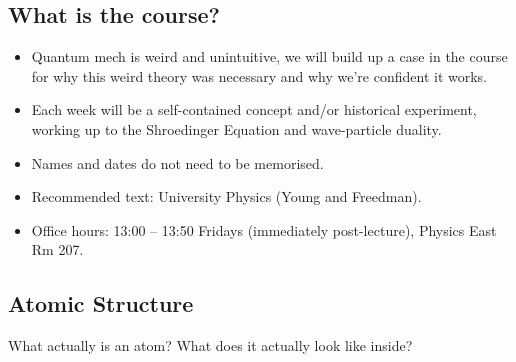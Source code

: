 
\subsection*{What is the course?}
\begin{itemize}
    \item Quantum mech is weird and unintuitive, we will build up a case in the course for why this weird theory was necessary and why we're confident it works.
    \item Each week will be a self-contained concept and/or historical experiment, working up to the Shroedinger Equation and wave-particle duality.
    \item Names and dates do not need to be memorised.
    \item Recommended text: University Physics (Young and Freedman).
    \item Office hours: 13:00 -- 13:50 Fridays (immediately post-lecture), Physics East Rm 207.
\end{itemize}

\subsection*{Atomic Structure}
What actually is an atom? What does it actually look like inside?

